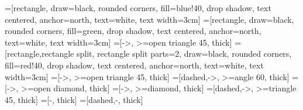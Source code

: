 \documentclass{minimal}
\begin{document}
=[rectangle, draw=black, rounded corners, fill=blue!40, drop shadow,
        text centered, anchor=north, text=white, text width=3cm]
=[rectangle, draw=black, rounded corners, fill=green, drop shadow,
        text centered, anchor=north, text=white, text width=3cm]
=[->, >=open triangle 45, thick]
=[rectangle,rectangle split, rectangle split parts=2, draw=black, rounded corners, fill=red!40, drop shadow, text centered, anchor=north, text=white, text width=3cm]
=[->, >=open triangle 45, thick]
=[dashed,->, >=angle 60, thick]
=[->, >=open diamond, thick]
=[->, >=diamond, thick]
=[dashed,->, >=triangle 45, thick]
=[-, thick]
=[dashed,-, thick]
\end{document}

